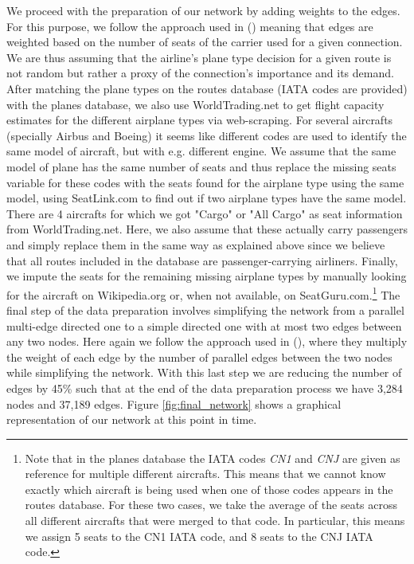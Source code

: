 \documentclass{Template resources/netsci-project}
\begin{document}
We proceed with the preparation of our network by adding weights to the edges. For this purpose, we follow the approach used in \citeauthor{Lawyer2016} (\citeyear{Lawyer2016}) meaning that edges are weighted based on the number of seats of the carrier used for a given connection. We are thus assuming that the airline's plane type decision for a given route is not random but rather a proxy of the connection's importance and its demand. After matching the plane types on the routes database (IATA codes are provided) with the planes database, we also use WorldTrading.net to get flight capacity estimates for the different airplane types via web-scraping. For several aircrafts (specially Airbus and Boeing) it seems like different codes are used to identify the same model of aircraft, but with e.g. different engine. We assume that the same model of plane has the same number of seats and thus replace the missing seats variable for these codes with the seats found for the airplane type using the same model, using SeatLink.com to find out if two airplane types have the same model. There are 4 aircrafts for which we got "Cargo" or "All Cargo" as seat information from WorldTrading.net. Here, we also assume that these actually carry passengers and simply replace them in the same way as explained above since we believe that all routes included in the database are passenger-carrying airliners. Finally, we impute the seats for the remaining missing airplane types by manually looking for the aircraft on Wikipedia.org or, when not available, on SeatGuru.com.\footnote{Note that in the planes database the IATA codes \textit{CN1} and \textit{CNJ} are given as reference for multiple different aircrafts. This means that we cannot know exactly which aircraft is being used when one of those codes appears in the routes database. For these two cases, we take the average of the seats across all different aircrafts that were merged to that code. In particular, this means we assign 5 seats to the CN1 IATA code, and 8 seats to the CNJ IATA code.} The final step of the data preparation involves simplifying the network from a parallel multi-edge directed one to a simple directed one with at most two edges between any two nodes. Here again we follow the approach used in \citeauthor{Lawyer2016} (\citeyear{Lawyer2016}), where they multiply the weight of each edge by the number of parallel edges between the two nodes while simplifying the network. With this last step we are reducing the number of edges by 45\% such that at the end of the data preparation process we have 3,284 nodes and 37,189 edges. Figure \ref{fig:final_network} shows a graphical representation of our network at this point in time. 
\end{document}
